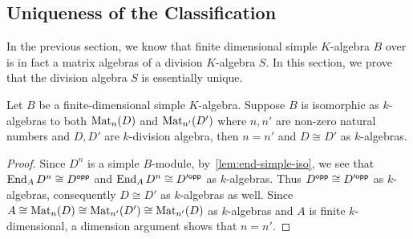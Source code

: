 \subsection{Uniqueness of the Classification}\label{sec:wed-artin-unique}
In the previous section, we know that finite dimensional simple $K$-algebra $B$
over is in fact a matrix algebras of a division $K$-algebra $S$. In this
section, we prove that the division algebra $S$ is essentially unique.

\begin{theorem} Let $B$ be a
  finite-dimensional simple $K$-algebra. Suppose $B$ is isomorphic as
  $k$-algebras to both $\operatorname{Mat}_{n}(D)$ and $\operatorname{Mat}_{n'}(D')$ where $n, n'$ are
  non-zero natural numbers and $D, D'$ are $k$-division algebra, then $n = n'$
  and $D \cong D'$ as $k$-algebras.\label{thm:wed-artin-unique} \leanok
\end{theorem}

\begin{proof}
  Since $D^{n}$ is a simple $B$-module, by~\cref{lem:end-simple-iso}, we see
  that $\operatorname{End}_{A}D^{n}\cong D^{\mathsf{opp}}$ and $\operatorname{End}_{A}D^{n}\cong D'^{\mathsf{opp}}$ as
  $k$-algebras. Thus $D^{\mathsf{opp}}\cong D'^{\mathsf{opp}}$ as $k$-algebras, consequently
  $D\cong D'$ as $k$-algebras as well. Since
  $A \cong \operatorname{Mat}_{n}(D)\cong \operatorname{Mat}_{n'}(D')\cong \operatorname{Mat}_{n'}(D)$ as $k$-algebras and
  $A$ is finite $k$-dimensional, a dimension argument shows that $n=n'$.
\end{proof}

